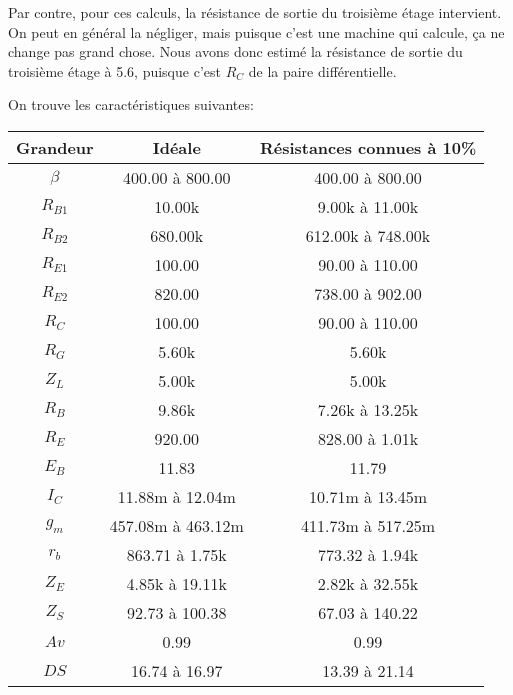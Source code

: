     Par contre, pour ces calculs, la résistance de sortie du troisième étage intervient.
    On peut en général la négliger, mais puisque c’est une machine qui calcule, ça ne
    change pas grand chose. Nous avons donc estimé la résistance de sortie du troisième
    étage à 5.6\kilo\ohm, puisque c’est $R_C$ de la paire différentielle.

   On trouve les caractéristiques suivantes:

   \begin{tabular}{|c|c|c|}
    \hline
     Grandeur  & Idéale           &   Résistances connues à 10\% \\\hline
     $\beta$     & 400.00 à 800.00 & 400.00 à 800.00 \\\hline
     $R_{B1}$   &      10.00k      & 9.00k à 11.00k  \\\hline
     $R_{B2}$   &     680.00k      &612.00k à 748.00k\\\hline
     $R_{E1}$   &      100.00      & 90.00 à 110.00  \\\hline
     $R_{E2}$   &      820.00      & 738.00 à 902.00 \\\hline
     $R_C$       &      100.00      & 90.00 à 110.00  \\\hline
     $R_G$       &      5.60k       &      5.60k       \\\hline
     $Z_L$       &      5.00k       &      5.00k       \\\hline
     $R_B$       &      9.86k       & 7.26k à 13.25k  \\\hline
     $R_E$       &      920.00      & 828.00 à 1.01k  \\\hline
     $E_B$       &      11.83       &      11.79       \\\hline
     $I_C$       & 11.88m à 12.04m & 10.71m à 13.45m \\\hline
     $g_m$       &457.08m à 463.12m&411.73m à 517.25m\\\hline
     $r_b$       & 863.71 à 1.75k  & 773.32 à 1.94k  \\\hline
     $Z_E$       & 4.85k à 19.11k  & 2.82k à 32.55k  \\\hline
     $Z_S$       & 92.73 à 100.38  & 67.03 à 140.22  \\\hline
     $Av$        &       0.99       &       0.99       \\\hline
     $DS$         &  16.74 à 16.97  &  13.39 à 21.14  \\\hline
  \end{tabular}


